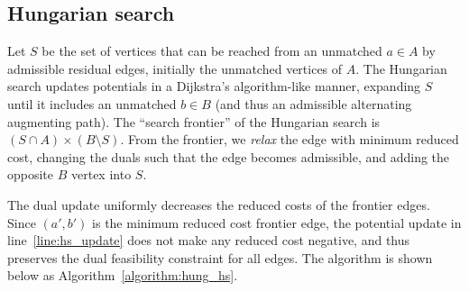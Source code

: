 \documentclass[11pt]{article}
\theoremstyle{plain}
\begin{document}
\subsection{Hungarian search}

Let $S$ be the set of vertices that can be reached from an unmatched $a \in A$
by admissible residual edges, initially the unmatched vertices of $A$.
The Hungarian search updates potentials in a Dijkstra's algorithm-like manner,
expanding $S$ until it includes an unmatched $b \in B$ (and thus an admissible
alternating augmenting path).
The ``search frontier'' of the Hungarian search is
$(S \cap A) \times (B \setminus S)$.
From the frontier, we \emph{relax} the edge with minimum reduced cost, changing
the duals such that the edge becomes admissible, and adding the opposite $B$
vertex into $S$.

The dual update uniformly decreases the reduced costs of the frontier edges.
Since $(a', b')$ is the minimum reduced cost frontier edge, the potential
update in line~\ref{line:hs_update} does not make any reduced cost negative,
and thus preserves the dual feasibility constraint for all edges.
The algorithm is shown below as Algorithm~\ref{algorithm:hung_hs}.
\end{document}
